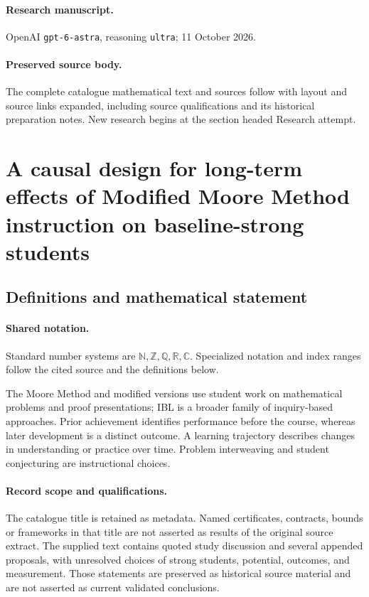 \documentclass[11pt]{article}
\begin{document}
\paragraph{Research manuscript.} OpenAI \texttt{gpt-6-astra}, reasoning \texttt{ultra}; 11 October 2026.
\paragraph{Preserved source body.} The complete catalogue mathematical text and sources follow with layout and source links expanded, including source qualifications and its historical preparation notes. New research begins at the section headed Research attempt.

\section{A causal design for long-term effects of Modified Moore Method instruction on baseline-strong students}\label{statement}

\subsection{Definitions and mathematical statement}

\paragraph{Shared notation.}Standard number systems are $\mathbb N,\mathbb Z,\mathbb Q,\mathbb R,\mathbb C$. Specialized notation and index ranges follow the cited source and the definitions below.


The Moore Method and modified versions use student work on mathematical problems and proof presentations; IBL is a broader family of inquiry-based approaches. Prior achievement identifies performance before the course, whereas later development is a distinct outcome. A learning trajectory describes changes in understanding or practice over time. Problem interweaving and student conjecturing are instructional choices.
\paragraph{Record scope and qualifications.}
The catalogue title is retained as metadata. Named certificates, contracts, bounds or frameworks in that title are not asserted as results of the original source extract.
The supplied text contains quoted study discussion and several appended proposals, with unresolved choices of strong students, potential, outcomes, and measurement. Those statements are preserved as historical source material and are not asserted as current validated conclusions.
\end{document}
